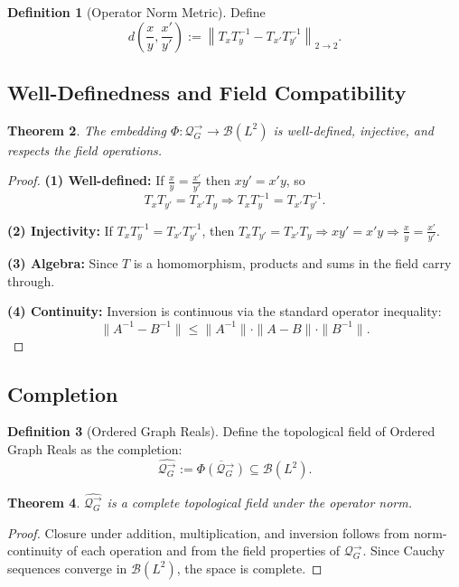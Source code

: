 \documentclass[11pt]{article}
\theoremstyle{definition}
\newtheorem{definition}{Definition}[section]
\theoremstyle{plain}
\newtheorem{theorem}[definition]{Theorem}
\theoremstyle{remark}
\begin{document}
\begin{definition}[Operator Norm Metric]
Define
\[
  d\left( \frac{x}{y}, \frac{x'}{y'} \right) := \left\| T_x T_y^{-1} - T_{x'} T_{y'}^{-1} \right\|_{2 \to 2}.
\]
\end{definition}

\subsection{Well-Definedness and Field Compatibility}

\begin{theorem}
The embedding \( \Phi: \mathcal{Q}_G^\to \to \mathcal{B}(L^2) \) is well-defined, injective, and respects the field operations.
\end{theorem}

\begin{proof}
\textbf{(1) Well-defined:} If \( \tfrac{x}{y} = \tfrac{x'}{y'} \) then \( xy' = x'y \), so
\[
  T_x T_{y'} = T_{x'} T_y \Rightarrow T_x T_y^{-1} = T_{x'} T_{y'}^{-1}.
\]

\textbf{(2) Injectivity:} If \( T_x T_y^{-1} = T_{x'} T_{y'}^{-1} \), then \( T_x T_{y'} = T_{x'} T_y \Rightarrow xy' = x'y \Rightarrow \tfrac{x}{y} = \tfrac{x'}{y'} \).

\textbf{(3) Algebra:} Since \( T \) is a homomorphism, products and sums in the field carry through.

\textbf{(4) Continuity:} Inversion is continuous via the standard operator inequality:
\[
  \| A^{-1} - B^{-1} \| \le \|A^{-1}\| \cdot \|A - B\| \cdot \|B^{-1}\|.
\]
\end{proof}

\subsection{Completion}

\begin{definition}[Ordered Graph Reals]
Define the topological field of Ordered Graph Reals as the completion:
\[
  \widehat{\mathcal{Q}_G^\to} := \overline{\Phi(\mathcal{Q}_G^\to)}
  \subseteq \mathcal{B}(L^2).
\]
\end{definition}

\begin{theorem}
\(\widehat{\mathcal{Q}_G^\to}\) is a complete topological field under the operator norm.
\end{theorem}

\begin{proof}
Closure under addition, multiplication, and inversion follows from norm-continuity of each operation and from the field properties of \( \mathcal{Q}_G^\to \). Since Cauchy sequences converge in \( \mathcal{B}(L^2) \), the space is complete.
\end{proof}
\end{document}
